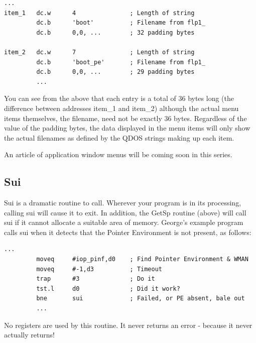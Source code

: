 \begin{lstlisting}[firstnumber=1,caption={EasyPEasy - SetAP Item List},label={lst:EasyPeasySetAPItemList}]
         ...
item_1   dc.w      4               ; Length of string
         dc.b      'boot'          ; Filename from flp1_
         dc.b      0,0, ...        ; 32 padding bytes

item_2   dc.w      7               ; Length of string
         dc.b      'boot_pe'       ; Filename from flp1_
         dc.b      0,0, ...        ; 29 padding bytes
         ...
\end{lstlisting}

You can see from the above that each entry is a total of 36 bytes long
            (the difference between addresses item\_1 and item\_2) although the actual menu
            items themselves, the filename, need not be exactly 36 bytes. Regardless of
            the value of the padding bytes, the data displayed in the menu items will only
            show the actual filenames as defined by the QDOS strings making up each
            item.

An article of application window menus will be coming soon in this
            series.

\subsection{Sui}
\label{ch26-sub-sui}%

Sui is a dramatic routine to call. Wherever your program is in its
            processing, calling sui will cause it to exit. In addition, the GetSp routine
            (above) will call sui if it cannot allocate a suitable area of memory.
            George's example program calls sui when it detects that the Pointer
            Environment is not present, as follows:

\begin{lstlisting}[firstnumber=1,caption={EasyPEasy - Sui Example},label={lst:EasyPeasySuiExample}]
         ...
         moveq     #iop_pinf,d0    ; Find Pointer Environment & WMAN
         moveq     #-1,d3          ; Timeout
         trap      #3              ; Do it
         tst.l     d0              ; Did it work?
         bne       sui             ; Failed, or PE absent, bale out
         ...
\end{lstlisting}

No registers are used by this routine. It never returns an error -{}
            because it never actually returns!


